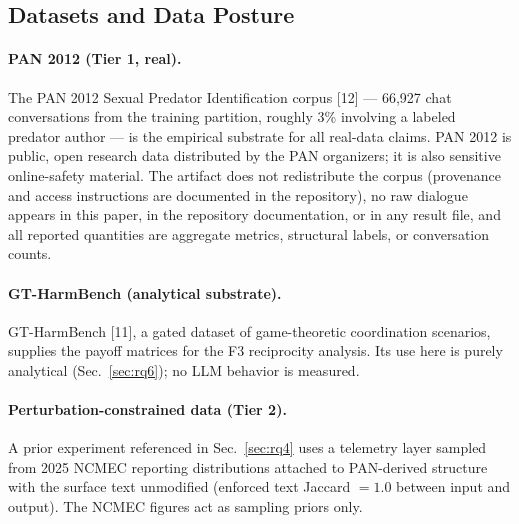 \documentclass[11pt]{article}
\begin{document}
\subsection{Datasets and Data Posture}

\paragraph{PAN 2012 (Tier 1, real).}
The PAN 2012 Sexual Predator Identification corpus [12] --- 66{,}927 chat conversations from the training partition, roughly 3\% involving a labeled predator author --- is the empirical substrate for all real-data claims. PAN 2012 is public, open research data distributed by the PAN organizers; it is also sensitive online-safety material. The artifact does not redistribute the corpus (provenance and access instructions are documented in the repository), no raw dialogue appears in this paper, in the repository documentation, or in any result file, and all reported quantities are aggregate metrics, structural labels, or conversation counts.

\paragraph{GT-HarmBench (analytical substrate).}
GT-HarmBench [11], a gated dataset of game-theoretic coordination scenarios, supplies the payoff matrices for the F3 reciprocity analysis. Its use here is purely analytical (Sec.~\ref{sec:rq6}); no LLM behavior is measured.

\paragraph{Perturbation-constrained data (Tier 2).}
A prior experiment referenced in Sec.~\ref{sec:rq4} uses a telemetry layer sampled from 2025 NCMEC reporting distributions attached to PAN-derived structure with the surface text unmodified (enforced text Jaccard $= 1.0$ between input and output). The NCMEC figures act as sampling priors only.
\end{document}
